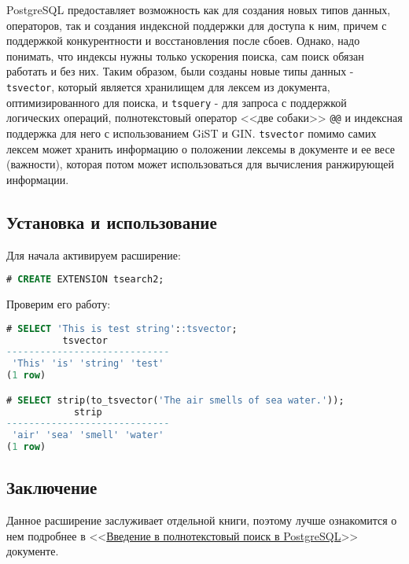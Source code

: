 PostgreSQL предоставляет возможность как для создания новых типов данных, операторов, так и создания индексной поддержки для доступа к ним, причем с поддержкой конкурентности и восстановления после сбоев. Однако, надо понимать, что индексы нужны только ускорения поиска, сам поиск обязан работать и без них. Таким образом, были созданы новые типы данных - \lstinline!tsvector!, который является хранилищем для лексем из документа, оптимизированного для поиска, и \lstinline!tsquery! - для запроса с поддержкой логических операций, полнотекстовый оператор <<две собаки>> \lstinline!@@! и индексная поддержка для него с использованием GiST и GIN. \lstinline!tsvector! помимо самих лексем может хранить информацию о положении лексемы в документе и ее весе (важности), которая потом может использоваться для вычисления ранжирующей информации.

\subsection{Установка и использование}

Для начала активируем расширение:

\begin{lstlisting}[language=SQL,label=lst:tsearch1,caption=Активация tsearch2]
# CREATE EXTENSION tsearch2;
\end{lstlisting}

Проверим его работу:

\begin{lstlisting}[language=SQL,label=lst:tsearch2,caption=Проверка tsearch2]
# SELECT 'This is test string'::tsvector;
          tsvector
-----------------------------
 'This' 'is' 'string' 'test'
(1 row)

# SELECT strip(to_tsvector('The air smells of sea water.'));
            strip
-----------------------------
 'air' 'sea' 'smell' 'water'
(1 row)
\end{lstlisting}


\subsection{Заключение}

Данное расширение заслуживает отдельной книги, поэтому лучше ознакомится о нем подробнее в <<\href{http://www.sai.msu.su/~megera/postgres/talks/fts\_pgsql\_intro.html}{Введение в полнотекстовый поиск в PostgreSQL}>> документе.
